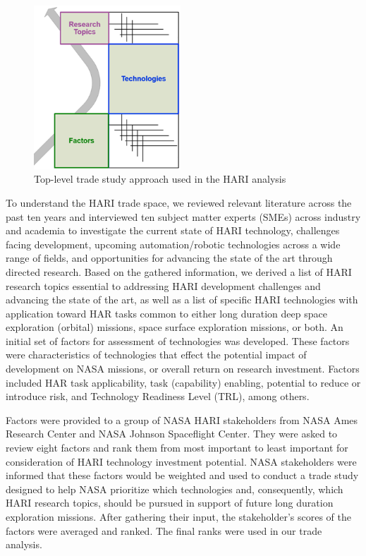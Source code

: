 \begin{figure}[b!]
    \begin{center}
        \includegraphics[width=0.49\textwidth]{figures/TradeStudy/figure1.png}
        \caption{Top-level trade study approach used in the HARI analysis}
        \label{figure:tradestudyapproach}
    \end{center}
\end{figure}
To understand the HARI trade space, we reviewed relevant literature across the past ten years and interviewed ten subject matter experts (SMEs) across industry and academia to investigate the current state of HARI technology, challenges facing development, upcoming automation/robotic technologies across a wide range of fields, and opportunities for advancing the state of the art through directed research.
Based on the gathered information, we derived a list of HARI research topics essential to addressing HARI development challenges and advancing the state of the art, as well as a list of specific HARI technologies with application toward HAR tasks common to either long duration deep space exploration (orbital) missions, space surface exploration missions, or both.
An initial set of factors for assessment of technologies was developed.
These factors were characteristics of technologies that effect the potential impact of development on NASA missions, or overall return on research investment.
Factors included HAR task applicability, task (capability) enabling, potential to reduce or introduce risk, and Technology Readiness Level (TRL), among others.

Factors were provided to a group of NASA HARI stakeholders from NASA Ames Research Center and NASA Johnson Spaceflight Center.
They were asked to review eight factors and rank them from most important to least important for consideration of HARI technology investment potential.
NASA stakeholders were informed that these factors would be weighted and used to conduct a trade study designed to help NASA prioritize which technologies and, consequently, which HARI research topics, should be pursued in support of future long duration exploration missions.
After gathering their input, the stakeholder's scores of the factors were averaged and ranked.
The final ranks were used in our trade analysis.

